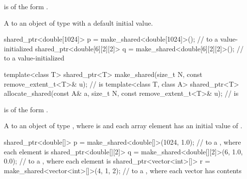 \begin{itemdescr}
\pnum
\constraints
{} is of the form .

\pnum
\returns
A  to an object of type 
with a default initial value.

\pnum
\begin{example}
\begin{codeblock}
shared_ptr<double[1024]> p = make_shared<double[1024]>();
  //  to a value-initialized 
shared_ptr<double[6][2][2]> q = make_shared<double[6][2][2]>();
  //  to a value-initialized 
\end{codeblock}
\end{example}
\end{itemdescr}

%
%
\begin{itemdecl}
template<class T>
  shared_ptr<T> make_shared(size_t N,
                            const remove_extent_t<T>& u);       //  is 
template<class T, class A>
  shared_ptr<T> allocate_shared(const A& a, size_t N,
                                const remove_extent_t<T>& u);   //  is 
\end{itemdecl}

\begin{itemdescr}
\pnum
\constraints
{} is of the form .

\pnum
\returns
A  to an object of type ,
where  is  and
each array element has an initial value of .

\pnum
\begin{example}
\begin{codeblock}
shared_ptr<double[]> p = make_shared<double[]>(1024, 1.0);
  //  to a , where each element is 
shared_ptr<double[][2]> q = make_shared<double[][2]>(6, {1.0, 0.0});
  //  to a , where each  element is 
shared_ptr<vector<int>[]> r = make_shared<vector<int>[]>(4, {1, 2});
  //  to a , where each vector has contents 
\end{codeblock}
\end{example}
\end{itemdescr}

